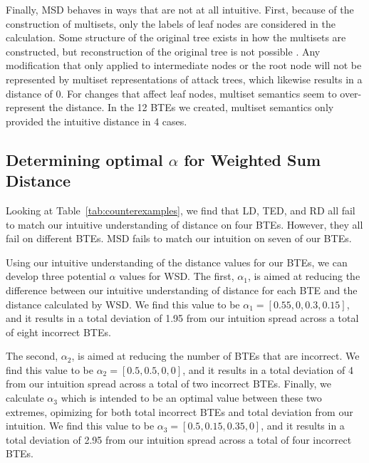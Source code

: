 Finally, MSD behaves in ways that are not at all intuitive. First, because of the construction of multisets, only the labels of leaf nodes are considered in the calculation. Some structure of the original tree exists in how the multisets are constructed, but reconstruction of the original tree is not possible \cite{mauw_foundations_2006}. Any modification that only applied to intermediate nodes or the root node will not be represented by multiset representations of attack trees, which likewise results in a distance of 0. For changes that affect leaf nodes, multiset semantics seem to over-represent the distance. In the 12 BTEs we created, multiset semantics only provided the intuitive distance in 4 cases.

\subsection{Determining optimal $\alpha$ for Weighted Sum Distance}
\label{ssec:results-alpha}


Looking at Table~\ref{tab:counterexamples}, we find that LD, TED, and RD all fail to match our intuitive understanding of distance on four BTEs. However, they all fail on different BTEs. MSD fails to match our intuition on seven of our BTEs.

Using our intuitive understanding of the distance values for our BTEs, we can develop three potential $\alpha$ values for WSD. The first, $\alpha_1$, is aimed at reducing the difference between our intuitive understanding of distance for each BTE and the distance calculated by WSD. We find this value to be $\alpha_1=[0.55, 0, 0.3, 0.15]$, and it results in a total deviation of 1.95 from our intuition spread across a total of eight incorrect BTEs.

The second, $\alpha_2$, is aimed at reducing the number of BTEs that are incorrect. We find this value to be $\alpha_2=[0.5,0.5,0,0]$, and it results in a total deviation of 4 from our intuition spread across a total of two incorrect BTEs. Finally, we calculate $\alpha_3$ which is intended to be an optimal value between these two extremes, opimizing for both total incorrect BTEs and total deviation from our intuition. We find this value to be $\alpha_3=[0.5, 0.15, 0.35, 0]$, and it results in a total deviation of 2.95 from our intuition spread across a total of four incorrect BTEs.

